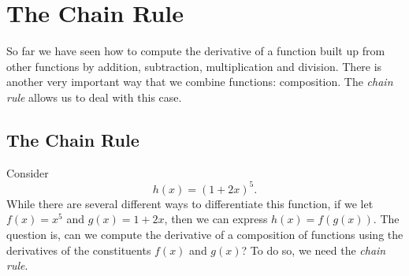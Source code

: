\chapter{The Chain Rule}




So far we have seen how to compute the derivative of a function built
up from other functions by addition, subtraction, multiplication and
division. There is another very important way that we combine
functions: composition. The \textit{chain rule} allows us to deal with
this case.

\section{The Chain Rule}


Consider
\[
h(x) = (1+2x)^5.
\] 
While there are several different ways to differentiate this function,
if we let $f(x) = x^5$ and $g(x) = 1+2x$, then we can express $h(x) =
f(g(x))$. The question is, can we compute the derivative of a
composition of functions using the derivatives of the constituents
$f(x)$ and $g(x)$? To do so, we need the \textit{chain rule}.

